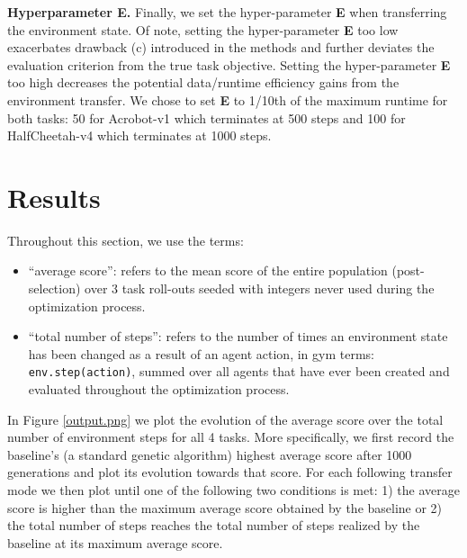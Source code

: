 \documentclass[dvipsnames,format=sigconf,anonymous=false,review=false]{acmart}
\begin{document}
\textbf{Hyperparameter E.} Finally, we set the hyper-parameter \textbf{E} when transferring the environment state. Of note, setting the hyper-parameter \textbf{E} too low exacerbates drawback (c) introduced in the methods and further deviates the evaluation criterion from the true task objective. Setting the hyper-parameter \textbf{E} too high decreases the potential data/runtime efficiency gains from the environment transfer. We chose to set \textbf{E} to 1/10th of the maximum runtime for both tasks: 50 for Acrobot-v1 which terminates at 500 steps and 100 for HalfCheetah-v4 which terminates at 1000 steps.

\section{Results}

Throughout this section, we use the terms:

\begin{itemize}
\item “average score”:  refers to the mean score of the entire population (post-selection) over 3 task roll-outs seeded with integers never used during the optimization process.
\item “total number of steps”:  refers to the number of times an environment state has been changed as a result of an agent action, in gym terms: \texttt{env.step(action)}, summed over all agents that have ever been created and evaluated throughout the optimization process.
\end{itemize}

In Figure \ref{output.png} we plot the evolution of the average score over the total number of environment steps for all 4 tasks. More specifically, we first record the baseline’s (a standard genetic algorithm) highest average score after 1000 generations and plot its evolution towards that score. For each following transfer mode we then plot until one of the following two conditions is met: 1) the average score is higher than the maximum average score obtained by the baseline or 2) the total number of steps reaches the total number of steps realized by the baseline at its maximum average score.
\end{document}

